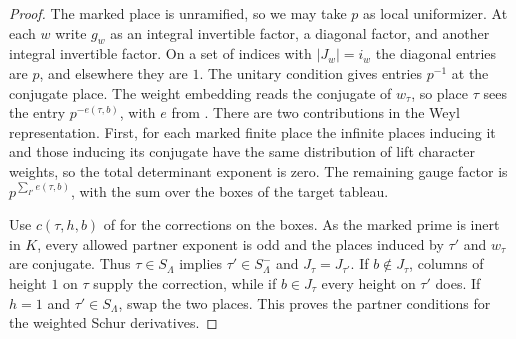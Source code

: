 \begin{proof}
The marked place is unramified, so we may take $p$ as local uniformizer. At each $w$ write $g_w$ as an integral invertible factor, a diagonal factor, and another integral invertible factor. On a set of indices with $|J_w|=i_w$ the diagonal entries are $p$, and elsewhere they are $1$. The unitary condition gives entries $p^{-1}$ at the conjugate place. The weight embedding reads the conjugate of $w_\tau$, so place $\tau$ sees the entry $p^{-e(\tau,b)}$, with $e$ from . There are two contributions in the Weyl representation. First, for each marked finite place the infinite places inducing it and those inducing its conjugate have the same distribution of lift character weights, so the total determinant exponent is zero. The remaining gauge factor is $p^{\sum_{I'} e(\tau,b)}$, with the sum over the boxes of the target tableau.

Use $c(\tau,h,b)$ of  for the corrections on the boxes. As the marked prime is inert in $K$, every allowed partner exponent is odd and the places induced by $\tau'$ and $w_\tau$ are conjugate. Thus $\tau\in S_\Lambda$ implies $\tau'\in S_\Lambda^-$ and $J_\tau=J_{\tau'}$. If $b\notin J_\tau$, columns of height $1$ on $\tau$ supply the correction, while if $b\in J_\tau$ every height on $\tau'$ does. If $h=1$ and $\tau'\in S_\Lambda$, swap the two places. This proves the partner conditions for the weighted Schur derivatives.


\end{proof}
